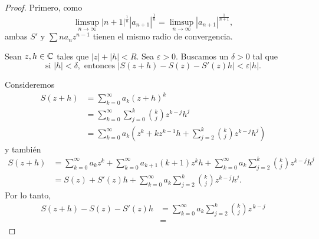 \begin{proof}
    Primero, como
    \begin{equation*}
        \limsup_{n \to \infty} |n+1|^{\frac{1}{n}} |a_{n+1}|^{\frac{1}{n}} = \limsup_{n \to \infty} |a_{n+1}|^{\frac{1}{n+1}},
    \end{equation*}
    ambas $S'$ y $\sum n a_n z^{n-1}$ tienen el mismo radio de convergencia.

    Sean $z, h \in \mathbb{C}$ tales que $|z| + |h| < R$. Sea $\varepsilon > 0$. Buscamos un $\delta > 0$ tal que
    \begin{equation*}
        \text{si }|h| < \delta, \text{ entonces } |S(z + h) - S(z) - S'(z)h| < \varepsilon |h|.
    \end{equation*}

    Consideremos 
    \begin{align*}
        S(z + h) &= \sum_{k=0}^\infty a_k (z+h)^k \\
        &= \sum_{k=0}^\infty \sum_{j=0}^k \binom{k}{j} z^{k-j}h^j \\
        &= \sum_{k=0}^\infty a_k \left( z^k + kz^{k-1} h + \sum_{j=2}^k \binom{k}{j} z^{k-j}h^j\right)
    \end{align*}
    y también
    \begin{align*}
        S(z+h) &= \sum_{k=0}^{\infty} a_k z^k 
        + \sum_{k=0}^{\infty} a_{k+1}(k+1) z^k h
        + \sum_{k=0}^{\infty} a_k \sum_{j=2}^{k} \binom{k}{j} z^{k-j} h^j \\
        &= S(z) 
        + S'(z)h
        + \sum_{k=0}^{\infty} a_k \sum_{j=2}^{k} \binom{k}{j} z^{k-j} h^j.
    \end{align*}
    Por lo tanto,
    \begin{align*}
        S(z + h) - S(z) - S'(z)h &= \sum_{k=0}^{\infty} a_k \sum_{j=2}^{k} \binom{k}{j} z^{\,k-j} \\ 
        &=
    \end{align*}
\end{proof}